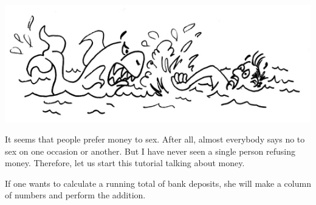 \documentclass[a4paper,12pt]{book}
\begin{document}
\includegraphics{figs-prefix/readyforaction.jpg}

It seems that people prefer money to sex.
After all, almost everybody says no to
sex on one occasion or another.
But I have never seen a single
person refusing money. Therefore, let us
start this tutorial talking about money.

If one wants to calculate a running
total of bank deposits, she will make
a column of numbers and perform the
addition.
\end{document}
